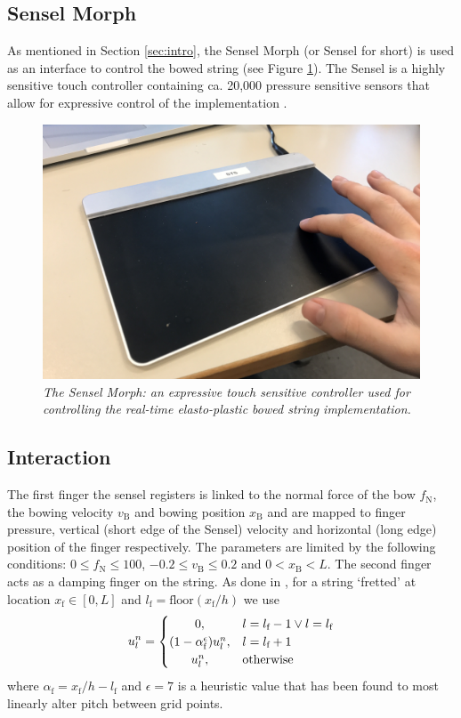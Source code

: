 \documentclass[twoside,a4paper,dvipsnames]{article}
\begin{document}
\subsection{Sensel Morph}
As mentioned in Section \ref{sec:intro}, the Sensel Morph (or Sensel for short) is used as an interface to control the bowed string (see Figure \ref{fig:sensel}). The Sensel is a highly sensitive touch controller containing ca. 20,000 pressure sensitive sensors that allow for expressive control of the implementation \cite{Sensel2019}.
\begin{figure}[ht]
\centerline{\includegraphics[width=1.0\columnwidth]{IMG_0637.jpg}}
\caption{\label{fig:sensel}{\it The Sensel Morph: an expressive touch sensitive controller used for controlling the real-time elasto-plastic bowed string implementation.}}
\end{figure}

\subsection{Interaction}
The first finger the sensel registers is linked to the normal force of the bow $f_\text{N}$, the bowing velocity $v_\text{B}$ and bowing position $x_\text{B}$ and are mapped to finger pressure, vertical (short edge of the Sensel) velocity and horizontal (long edge) position of the finger respectively. The parameters are limited by the following conditions: $0 \leq f_\text{N} \leq 100$, $-0.2 \leq v_\text{B} \leq 0.2$ and $0<x_\text{B}<L$. The second finger acts as a damping finger on the string. As done in \cite{Willemsen2019}, for a string `fretted' at location $x_\text{f}\in[0,L]$ and $l_\text{f}=\text{floor}(x_\text{f}/h)$ we use
\begin{equation}
u_l^n = 
    \begin{cases}
        \hfil 0, & l = l_\text{f} - 1 \vee l = l_\text{f}\\
        \hfil (1-\alpha_\text{f}^\epsilon) u_l^n, & l = l_\text{f} + 1\\
        \hfil u_l^n, & \text{otherwise}
    \end{cases}
\end{equation}
where $\alpha_\text{f} = x_\text{f} / h - l_\text{f}$ and $\epsilon = 7$ is a heuristic value that has been found to most linearly alter pitch between grid points. 
\end{document}
